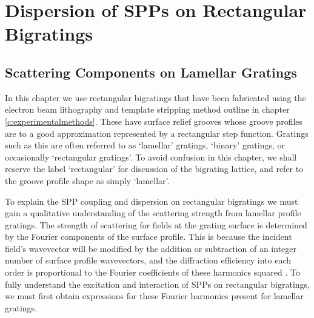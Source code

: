 \section{Dispersion of SPPs on Rectangular Bigratings}

\subsection{Scattering Components on Lamellar Gratings\label{s:components}}

In this chapter we use rectangular bigratings that have been fabricated using the electron beam lithography and template stripping method outline in chapter \ref{c:experimentalmethods}. These have surface relief grooves whose groove profiles are to a good approximation represented by a rectangular step function. Gratings such as this are often referred to as `lamellar' gratings, `binary' gratings, or occasionally `rectangular gratings'. To avoid confusion in this chapter, we shall reserve the label `rectangular' for discussion of the bigrating lattice, and refer to the groove profile shape as simply `lamellar'.

To explain the SPP coupling and dispersion on rectangular bigratings we must gain a qualitative understanding of the scattering strength from lamellar profile gratings. The strength of scattering for fields at the grating surface is determined by the Fourier components of the surface profile. This is because the incident field's wavevector will be modified by the addition or subtraction of an integer number of surface profile wavevectors, and the diffraction efficiency into each order is proportional to the Fourier coefficients of these harmonics squared \cite{Goodman2005,Sanchez-Lopez2009}. To fully understand the excitation and interaction of SPPs on rectangular bigratings, we must first obtain expressions for these Fourier harmonics present for lamellar gratings. 

